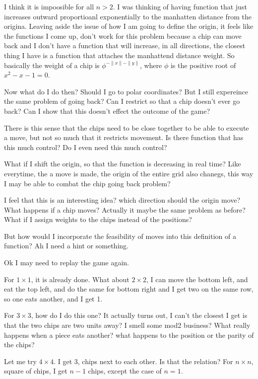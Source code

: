 \documentclass[12pt,tikz,border=10pt]{article}
\theoremstyle{definition}
\theoremstyle{remark}
\begin{document}
I think it is impoosible for all $n>2$. I was thinking of having function that just 
increases outward proportioanl exponentially to the manhatten distance from the origina. Leaving 
aside the issue of how I am going to define the origin, it feels like the functions I come up,
don't work for this problem because a chip can move back and I don't have a function that will increase, 
in all directions, the closest thing I have is a function that attaches the manhattend distance weight. 
So basically the weight of a chip is $\phi^{-\|x\|-\|y\|}$, where $\phi$ is the positive root of $x^2-x-1=0$.

Now what do I do then? Should I go to polar coordinates? But I still expereince the same problem of going back?
Can I restrict so that a chip doesn't ever go back? Can I show that this doesn't effect the outcome of the game?

There is this sense that the chips need to be close together to be able to execute a move, but not so much that
it restricts movement. Is there function that has this much control? Do I even need this much control?

What if I shift the origin, so that the function is decreasing in real time? Like everytime, the a move is made, 
the origin of the entire grid also chanegs, this way I may be able to combat the chip going back problem?

I feel that this is an interesting idea? which direction should the origin move? What happens if a chip moves?
Actually it maybe the same problem as before? What if I assign weights to the chips instead of the positions? 

But how would I incorporate the feasibility of moves into this definition of a function?
Ah I need a hint or something.

Ok I may need to replay the game again.

For $1\times 1$, it is already done.
What about $2\times 2$, I can move the bottom left, and eat the top left, and do the same for bottom right and 
I get two on the same row, so one eats another, and I get 1.

For $3\times 3$, how do I do this one? It actually turns out, I can't the closest I get is that the two chips are two units
away? I smell some mod2 business?
What really happens when a piece eats another? what happens to the position or the parity of the chips?

Let me try $4 \times 4$. I get 3, chips next to each other. Is that the relation? For $n \times n$, square of chips,
I get $n-1$ chips, except the case of $n=1$.
\end{document}
